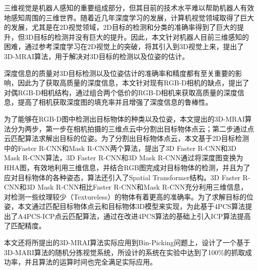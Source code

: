 \begin{cabstract}
  三维视觉是机器人感知的重要组成部分，但其目前的技术水平难以帮助机器人有效地感知周围的三维世界。随着近几年深度学习的发展，计算机视觉领域取得了巨大的发展，尤其是在2D视觉领域，2D目标的检测和分类的准确率得到了巨大的提升，但3D目标的检测并没有巨大的提升。因此，本文针对机器人目前三维感知的困难，通过参考深度学习在2D视觉上的突破，将其引入到3D视觉上来，提出了3D-MRAI算法，用于解决对3D目标的检测以及位姿的估计。

  深度信息的质量对3D目标检测以及位姿估计的准确率和精度都有至关重要的影响，因此为了获取高质量的深度信息，本文针对现有RGB-D相机的缺点，提出了对偶RGB-D相机结构，通过组合两个低价的RGB-D相机来获取高质量的深度信息，提高了相机获取深度图的填充率并且增强了深度信息的鲁棒性。

  为了能够在RGB-D图中检测出目标物体的种类以及位姿，本文提出的3D-MRAI算法分为两步，第一步在相机拍摄的三维点云中分割出目标物体点云；第二步通过点云匹配算法求解出目标的位姿。为了分割出目标物体点云，本文基于2D目标检测中的Faster R-CNN和Mask R-CNN两个算法，提出了3D Faster R-CNN和3D Mask R-CNN算法，3D Faster R-CNN和3D Mask R-CNN通过将深度图变换为HHA图，有效地利用三维信息，并结合RGB图完成对目标物体的检测，并且为了应对目标物体的各种姿态，算法还引入了Spatial Transformer结构。3D Faster R-CNN和3D Mask R-CNN相比Faster R-CNN和Mask R-CNN充分利用三维信息，对检测一些纹理较少（Textureless）的物体有着更高的准确率。为了求解目标的位姿，本文通过匹配目标物体点云和目标物体3D模型来实现，为此基于4PCS算法提出了A4PCS-ICP点云匹配算法，通过在改进4PCS算法的基础上引入ICP算法提高了匹配精度。

  本文还将所提出的3D-MRAI算法实际应用到Bin-Picking问题上，设计了一个基于3D-MARI算法的随机分拣视觉系统，所设计的系统在实验中达到了100\%的抓取成功率，并且算法的运算时间也完全满足实际应用。
\end{cabstract}



